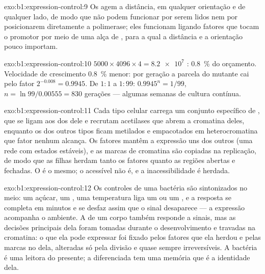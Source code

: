 \begin{solution}{exo:b1:expression-control:9}
Os  agem a distância, em qualquer orientação e de
qualquer lado, de modo que não podem funcionar por serem lidos nem por
posicionarem diretamente a polimerase; eles funcionam ligando fatores
que tocam o promotor por meio de uma alça de , para a qual a
distância e a orientação pouco importam.
\end{solution}

\begin{solution}{exo:b1:expression-control:10}
$5000\times 4096\times 4 = \num{8.2e7}$ : \qty{0.8}{\%} do orçamento.
Velocidade de crescimento \qty{0.8}{\%} menor: por geração a parcela do
mutante cai pelo fator $2^{-0.008} = 0.9945$. De $1:1$ a $1:99$:
$0.9945^n = 1/99$, $n = \ln 99/0.00555 = 830$ gerações --- algumas
semanas de cultura contínua.
\end{solution}

\begin{solution}{exo:b1:expression-control:11}
Cada tipo celular carrega um conjunto específico de , que se ligam aos  dos  dele e recrutam
acetilases que abrem a cromatina deles, enquanto os  dos outros
tipos ficam metilados e empacotados em heterocromatina que fator nenhum
alcança. Os fatores mantêm a expressão uns dos outros (uma rede com
estados estáveis), e as marcas de cromatina são copiadas na replicação,
de modo que as filhas herdam tanto os fatores quanto as regiões abertas
e fechadas. O  é o mesmo; o  acessível não é, e a
inacessibilidade é herdada.
\end{solution}

\begin{solution}{exo:b1:expression-control:12}
Os controles de uma bactéria são sintonizados no meio: um açúcar, um
, uma temperatura liga um  ou um , e a
resposta se completa em minutos e se desfaz assim que o sinal
desaparece --- a expressão acompanha o ambiente. A  de um corpo
também responde a sinais, mas as decisões principais dela foram tomadas
durante o desenvolvimento e travadas na cromatina: o que ela pode
expressar foi fixado pelos fatores que ela herdou e pelas marcas no 
dela, alteradas só pela divisão e quase sempre irreversíveis. A bactéria
é uma leitora do presente; a  diferenciada tem uma memória que é a
identidade dela.
\end{solution}

